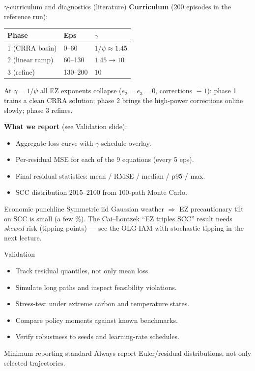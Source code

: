 \documentclass[aspectratio=169,11pt]{beamer}
\newcommand{\emphc}[1]{\textcolor{harvardcrimson}{#1}}
\begin{document}
\begin{frame}{$\gamma$-curriculum and diagnostics (literature)}
\footnotesize
\textbf{Curriculum} (200 episodes in the reference run):
\begin{center}
\begin{tabular}{lll}
\toprule
\textbf{Phase} & \textbf{Eps} & $\gamma$ \\
\midrule
1 (CRRA basin)  & 0--60   & $1/\psi \approx 1.45$ \\
2 (linear ramp) & 60--130 & $1.45 \to 10$ \\
3 (refine)      & 130--200 & $10$ \\
\bottomrule
\end{tabular}
\end{center}
At $\gamma = 1/\psi$ all EZ exponents collapse ($e_2 = e_3 = 0$, corrections $\equiv 1$): phase 1 trains a clean CRRA solution; phase 2 brings the high-power corrections online slowly; phase 3 refines.

\textbf{What we report} (see Validation slide):
\begin{itemize}\setlength\itemsep{0pt}
    \item Aggregate loss curve with $\gamma$-schedule overlay.
    \item Per-residual MSE for each of the 9 equations (every 5 eps).
    \item Final residual statistics: mean / RMSE / median / p95 / max.
    \item SCC distribution 2015--2100 from 100-path Monte Carlo.
\end{itemize}

\begin{exampleblock}{Economic punchline}
Symmetric iid Gaussian weather $\Rightarrow$ EZ precautionary tilt on SCC is small (a few \%). The Cai--Lontzek ``EZ triples SCC'' result needs \emph{skewed} risk (tipping points) --- see the OLG-IAM with stochastic tipping in the next lecture.
\end{exampleblock}
\vspace{-0.1cm}
\end{frame}

\begin{frame}{Validation}
\begin{itemize}
    \item Track residual quantiles, not only mean loss.
    \item Simulate long paths and inspect feasibility violations.
    \item Stress-test under extreme carbon and temperature states.
    \item Compare policy moments against known benchmarks.
    \item Verify robustness to seeds and learning-rate schedules.
\end{itemize}

\vspace{0.25cm}
\begin{alertblock}{Minimum reporting standard}
Always report Euler/residual \emphc{distributions}, not only selected trajectories.
\end{alertblock}
\end{frame}
\end{document}
